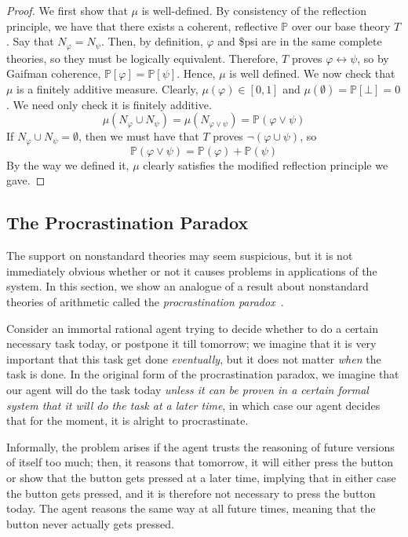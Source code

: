 \documentclass[12pt]{article}
\newcommand{\PP}{\mathbb{P}}
\newcommand{\vp}{\varphi}
\theoremstyle{plain}
\theoremstyle{definition}
\theoremstyle{remark}
\begin{document}
\begin{proof}
We first show that $\mu$ is well-defined. By consistency of the reflection principle, we have that there exists a coherent, reflective $\PP$ over our base theory $T$.
Say that $N_{\vp}=N_{\psi}$. Then, by definition, $\vp$ and \$psi are in the same complete theories, so they must be logically equivalent. Therefore, $T$ proves $\vp\leftrightarrow\psi$, so by Gaifman coherence, $\PP[\vp]=\PP[\psi]$. Hence, $\mu$ is well defined.
We now check that $\mu$ is a finitely additive measure. Clearly, $\mu(\vp)\in[0,1]$ and $\mu(\emptyset)=\PP[\bot]=0$.
We need only check it is finitely additive. 
$$\mu(N_{\vp}\cup N_{\psi})=\mu(N_{\vp\vee\psi})=\PP(\vp\vee\psi)$$
If $N_{\vp}\cup N_{\psi}=\emptyset$, then we must have that $T$ proves $\neg(\vp\cup\psi)$, so 
$$\PP(\vp\vee\psi)=\PP(\vp)+\PP(\psi)$$
By the way we defined it, $\mu$ clearly satisfies the modified reflection principle we gave.
\end{proof}
\subsection{The Procrastination Paradox}


The support on nonstandard theories may seem suspicious, but it is not immediately obvious whether or not it causes problems in applications of the system. In this section, we show an analogue of a result about nonstandard theories of arithmetic called the \emph{procrastination paradox}~\cite{yudkowsky13}. 

Consider an immortal rational agent trying to decide whether to do a certain necessary task today, or postpone it till tomorrow; we imagine that it is very important that this task get done \emph{eventually}, but it does not matter \emph{when} the task is done. In the original form of the procrastination paradox, we imagine that our agent will do the task today \emph{unless it can be proven in a certain formal system that it will do the task at a later time}, in which case our agent decides that for the moment, it is alright to procrastinate.

Informally, the problem arises if the agent trusts the reasoning of future versions of itself too much; then, it reasons that tomorrow, it will either press the button or show that the button gets pressed at a later time, implying that in either case the button gets pressed, and it is therefore not necessary to press the button today. The agent reasons the same way at all future times, meaning that the button never actually gets pressed.
\end{document}
